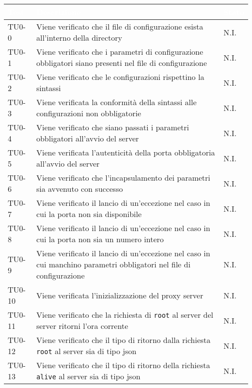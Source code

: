 \begin{longtable}{|C{.15\textwidth}|m{.66\textwidth}|C{.10\textwidth}|}
\hline
{}\textbf{\textcolor{white}{Test}}  & \textbf{\textcolor{white}{Descrizione}} & \textbf{\textcolor{white}{Stato}}\\
\hline \hline
\endhead

TU0-0 & Viene verificato che il file di configurazione esista all'interno della directory & N.I.\\
\hline 
{} TU0-1 & Viene verificato che i parametri di configurazione obbligatori siano presenti nel file di configurazione & N.I. \\ 
\hline
TU0-2 & Viene verificato che le configurazioni rispettino la sintassi & N.I. \\ 
\hline
{} TU0-3 & Viene verificata la conformità della sintassi alle configurazioni non obbligatorie & N.I. \\ 
\hline 
TU0-4 & Viene verificato che siano passati i parametri obbligatori all'avvio del server & N.I. \\ 
\hline
{} TU0-5 & Viene verificata l'autenticità della porta obbligatoria all'avvio del server & N.I. \\ 
\hline
TU0-6 & Viene verificato  che l'incapsulamento dei parametri sia avvenuto con successo & N.I. \\
\hline 
{} TU0-7 & Viene verificato il lancio di un'eccezione nel caso in cui la porta non sia disponibile & N.I. \\ 
\hline 
TU0-8 & Viene verificato il lancio di un'eccezione nel caso in cui la porta non sia un numero intero & N.I. \\
\hline
{}  TU0-9 & Viene verificato il lancio di un'eccezione nel caso in cui manchino parametri obbligatori nel file di configurazione & N.I. \\ 
\hline
TU0-10 & Viene verificata l'inizializzazione del proxy server & N.I. \\ 
\hline 
{} TU0-11 & Viene verificato che la richiesta di \texttt{root} al server del server ritorni l'ora corrente & N.I. \\ 
\hline
TU0-12 & Viene verificato che il tipo di ritorno dalla richiesta \texttt{root} al server sia di tipo json & N.I. \\ 
\hline 
{}TU0-13 & Viene verificato che il tipo di ritorno della richiesta \texttt{alive} al server sia di tipo json & N.I. \\ 

\end{longtable}
